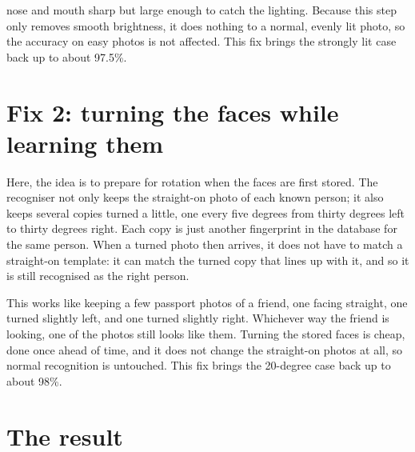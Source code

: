 \documentclass[11pt]{article}
\begin{document}
nose and mouth sharp but large enough to catch the lighting. Because this step only removes smooth brightness, it does nothing to a normal, evenly lit photo, so the accuracy on easy photos is not affected. This fix brings the strongly lit case back up to about 97.5\%.

\section{Fix 2: turning the faces while learning them}

Here, the idea is to prepare for rotation when the faces are first stored. The recogniser not only keeps the straight-on photo of each known person; it also keeps several copies turned a little, one every five degrees from thirty degrees left to thirty degrees right. Each copy is just another fingerprint in the database for the same person. When a turned photo then arrives, it does not have to match a straight-on template: it can match the turned copy that lines up with it, and so it is still recognised as the right person.

This works like keeping a few passport photos of a friend, one facing straight, one turned slightly left, and one turned slightly right. Whichever way the friend is looking, one of the photos still looks like them. Turning the stored faces is cheap, done once ahead of time, and it does not change the straight-on photos at all, so normal recognition is untouched. This fix brings the 20-degree case back up to about 98\%.

\section{The result}
\end{document}
